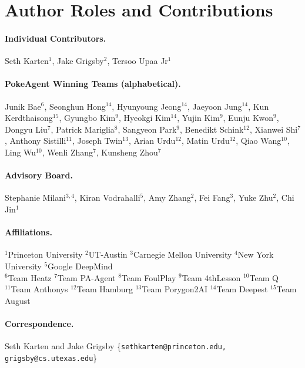 \section{Author Roles and Contributions}
\label{sec:authors}

\paragraph{Individual Contributors.}
Seth Karten$^{1}$, Jake Grigsby$^{2}$, Tersoo Upaa Jr$^{1}$

\paragraph{PokeAgent Winning Teams (alphabetical).}
Junik Bae$^{6}$,
Seonghun Hong$^{14}$,
Hyunyoung Jeong$^{14}$,
Jaeyoon Jung$^{14}$,
Kun Kerdthaisong$^{15}$,
Gyungbo Kim$^{9}$,
Hyeokgi Kim$^{14}$,
Yujin Kim$^{9}$,
Eunju Kwon$^{9}$,
Dongyu Liu$^{7}$,
Patrick Mariglia$^{8}$,
Sangyeon Park$^{9}$,
Benedikt Schink$^{12}$,
Xianwei Shi$^{7}$,
Anthony Sistilli$^{11}$,
Joseph Twin$^{13}$,
Arian Urdu$^{12}$,
Matin Urdu$^{12}$,
Qiao Wang$^{10}$,
Ling Wu$^{10}$,
Wenli Zhang$^{7}$,
Kunsheng Zhou$^{7}$

\paragraph{Advisory Board.}
Stephanie Milani$^{3,4}$, Kiran Vodrahalli$^{5}$, Amy Zhang$^{2}$, Fei Fang$^{3}$, Yuke Zhu$^{2}$, Chi Jin$^{1}$

\paragraph{Affiliations.}
$^{1}$Princeton University \quad $^{2}$UT-Austin \quad $^{3}$Carnegie Mellon University \quad $^{4}$New York University \quad $^{5}$Google DeepMind \\
$^{6}$Team Heatz \quad $^{7}$Team PA-Agent \quad $^{8}$Team FoulPlay \quad $^{9}$Team 4thLesson \quad $^{10}$Team Q \\
$^{11}$Team Anthonys \quad $^{12}$Team Hamburg \quad $^{13}$Team Porygon2AI \quad $^{14}$Team Deepest \quad $^{15}$Team August

\paragraph{Correspondence.} Seth Karten and Jake Grigsby \quad \{\texttt{sethkarten@princeton.edu, grigsby@cs.utexas.edu}\}
